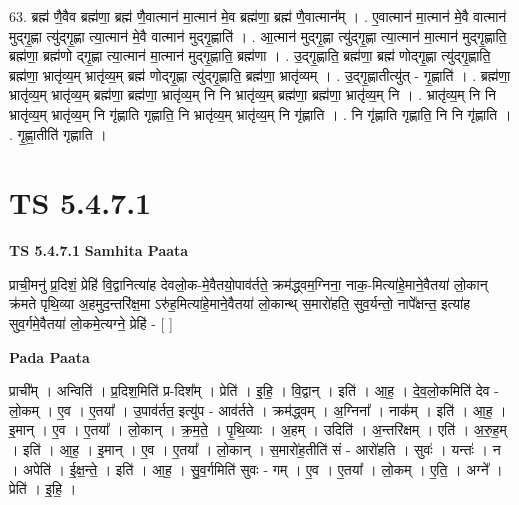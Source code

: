 \documentclass[17pt]{extarticle}
\begin{document}
63. ब्रह्म॑ णै॒वैव ब्रह्म॑णा॒ ब्रह्म॑ णै॒वात्मान॑ मा॒त्मान॑ मे॒व ब्रह्म॑णा॒ ब्रह्म॑ णै॒वात्मान᳚म् । . ए॒वात्मान॑ मा॒त्मान॑ मे॒वै वात्मान॑ मुद्‍गृ॒ह्णा त्यु॑द्‍गृ॒ह्णा त्या॒त्मान॑ मे॒वै वात्मान॑ मुद्‍गृ॒ह्णाति॑ । . आ॒त्मान॑ मुद्‍गृ॒ह्णा त्यु॑द्‍गृ॒ह्णा त्या॒त्मान॑ मा॒त्मान॑ मुद्‍गृ॒ह्णाति॒ ब्रह्म॑णा॒ ब्रह्म॑णो द्‍गृ॒ह्णा त्या॒त्मान॑ मा॒त्मान॑ मुद्‍गृ॒ह्णाति॒ ब्रह्म॑णा । . उ॒द्‍गृ॒ह्णाति॒ ब्रह्म॑णा॒ ब्रह्म॑ णोद्‍गृ॒ह्णा त्यु॑द्‍गृ॒ह्णाति॒ ब्रह्म॑णा॒ भ्रातृ॑व्य॒म् भ्रातृ॑व्य॒म् ब्रह्म॑ णोद्‍गृ॒ह्णा त्यु॑द्‍गृ॒ह्णाति॒ ब्रह्म॑णा॒ भ्रातृ॑व्यम् । . उ॒द्‍गृ॒ह्णातीत्यु॑त् - गृ॒ह्णाति॑ । . ब्रह्म॑णा॒ भ्रातृ॑व्य॒म् भ्रातृ॑व्य॒म् ब्रह्म॑णा॒ ब्रह्म॑णा॒ भ्रातृ॑व्य॒म् नि नि भ्रातृ॑व्य॒म् ब्रह्म॑णा॒ ब्रह्म॑णा॒ भ्रातृ॑व्य॒म् नि । . भ्रातृ॑व्य॒म् नि नि भ्रातृ॑व्य॒म् भ्रातृ॑व्य॒म् नि गृ॑ह्णाति गृह्णाति॒ नि भ्रातृ॑व्य॒म् भ्रातृ॑व्य॒म् नि गृ॑ह्णाति । . नि गृ॑ह्णाति गृह्णाति॒ नि नि गृ॑ह्णाति । . गृ॒ह्णा॒तीति॑ गृह्णाति । \newline
\pagebreak
{}

\section{ TS 5.4.7.1 }

\textbf{TS 5.4.7.1 } \newline
\textbf{Samhita Paata} \newline

प्राची॒मनु॑ प्र॒दिशं॒ प्रेहि॑ वि॒द्वानित्या॑ह देवलो॒क-मे॒वैतयो॒पाव॑र्तते॒ क्रम॑द्ध्वम॒ग्निना॒ नाक॒-मित्या॑हे॒माने॒वैतया॑ लो॒कान् क्र॑मते पृथि॒व्या अ॒हमुद॒न्तरि॑क्ष॒मा ऽरु॑ह॒मित्या॑हे॒माने॒वैतया॑ लो॒कान्थ् स॒मारो॑हति॒ सुव॒र्यन्तो॒ नापे᳚क्षन्त॒ इत्या॑ह सुव॒र्गमे॒वैतया॑ लो॒कमे॒त्यग्ने॒ प्रेहि॑ - [  ] \newline

\textbf{Pada Paata} \newline

प्राची᳚म् । अन्विति॑ । प्र॒दिश॒मिति॑ प्र-दिश᳚म् । प्रेति॑ । इ॒हि॒ । वि॒द्वान् । इति॑ । आ॒ह॒ । दे॒व॒लो॒कमिति॑ देव - लो॒कम् । ए॒व । ए॒तया᳚ । उ॒पाव॑र्तत॒ इत्यु॑प - आव॑र्तते । क्रम॑द्ध्वम् । अ॒ग्निना᳚ । नाक᳚म् । इति॑ । आ॒ह॒ । इ॒मान् । ए॒व । ए॒तया᳚ । लो॒कान् । क्र॒म॒ते॒ । पृ॒थि॒व्याः । अ॒हम् । उदिति॑ । अ॒न्तरि॑क्षम् । एति॑ । अ॒रु॒ह॒म् । इति॑ । आ॒ह॒ । इ॒मान् । ए॒व । ए॒तया᳚ । लो॒कान् । स॒मारो॑ह॒तीति॑ सं - आरो॑हति । सुवः॑ । यन्तः॑ । न । अपेति॑ । ई॒क्ष॒न्ते॒ । इति॑ । आ॒ह॒ । सु॒व॒र्गमिति॑ सुवः - गम् । ए॒व । ए॒तया᳚ । लो॒कम् । ए॒ति॒ । अग्ने᳚ । प्रेति॑ । इ॒हि॒ ।  \newline
\end{document}
